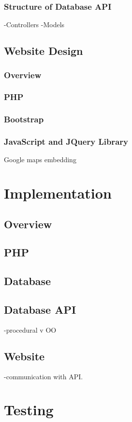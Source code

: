 \documentclass[11pt]{article}
\begin{document}
		\subsubsection{Structure of Database API}
		-Controllers
		-Models
	\subsection{Website Design}
		\subsubsection{Overview}
		\subsubsection{PHP}
		\subsubsection{Bootstrap}
		\subsubsection{JavaScript and JQuery Library}
		Google maps embedding

\section{Implementation}
	\subsection{Overview}
	\subsection{PHP}
	\subsection{Database}
	\subsection{Database API}
	-procedural v OO
	\subsection{Website}
	-communication with API.
	
\section{Testing}
\end{document}
